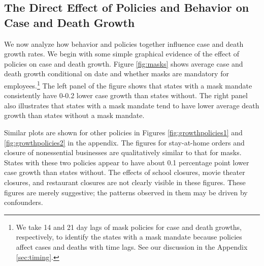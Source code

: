 \documentclass[3p, longtitle]{elsarticle}
\theoremstyle{definition}
\begin{document}
\subsection{The Direct Effect of Policies and Behavior on Case
and Death Growth\label{policy-behavior-and-case-growth}}

We now analyze how behavior and policies together influence case and death
growth rates. We begin with some simple graphical evidence of the
effect of policies on case and death growth. Figure \ref{fig:masks}
shows average case and death growth conditional on date and whether
masks are mandatory for employees.\footnote{We take 14 and 21 day lags of mask policies for case and death growths, respectively, to  identify the states with a mask mandate because policies affect cases and deaths with time lags. See our discussion in the Appendix \ref{sec:timing}.} The   left panel of the figure shows that states with a mask mandate consistently have 0-0.2 lower case
growth than states without. The  right panel also illustrates that
states with a mask mandate tend to have lower average death growth than states without a mask mandate.


Similar plots are shown for other policies in Figures
\ref{fig:growthpolicies1} and \ref{fig:growthpolicies2} in the
appendix. The  figures for stay-at-home orders and closure
of nonessential businesses are qualitatively similar to that for
masks. States with these two policies appear to have about 0.1 percentage point lower
case growth  than states without. The effects of school closures, movie theater closures, and
restaurant closures are not clearly visible in these figures. These
figures are merely suggestive; the patterns observed in them may be
driven by confounders.
\end{document}
